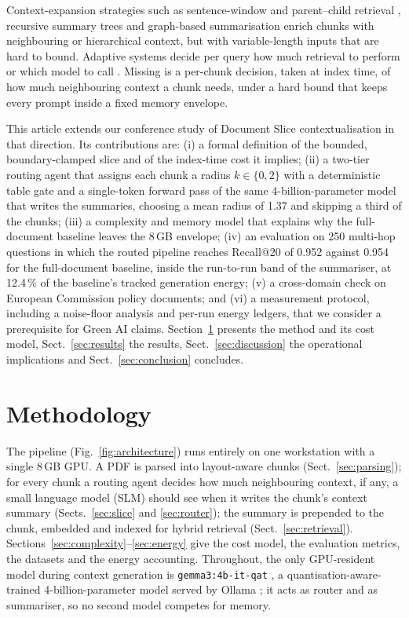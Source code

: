 \documentclass[pdflatex,sn-mathphys-num]{sn-jnl}
\makeatletter
\newcommand{\Rec}[1]{Recall@#1}
\theoremstyle{thmstyleone}%
\theoremstyle{thmstylethree}%
\makeatother
\begin{document}
Context-expansion strategies such as sentence-window and parent--child retrieval \cite{gao2024retrievalaugmentedgenerationlargelanguage,Liu_LlamaIndex_2022}, recursive summary trees \cite{sarthi2024raptorrecursiveabstractiveprocessing} and graph-based summarisation \cite{edge2024graphrag} enrich chunks with neighbouring or hierarchical context, but with variable-length inputs that are hard to bound. Adaptive systems decide per query how much retrieval to perform \cite{jeong2024adaptiverag,asai2024selfrag} or which model to call \cite{ong2024routellm,chen2023frugalgpt}. Missing is a per-chunk decision, taken at index time, of how much neighbouring context a chunk needs, under a hard bound that keeps every prompt inside a fixed memory envelope.

This article extends our conference study of Document Slice contextualisation \cite{sandor2025documentslicecontextualretrieval} in that direction. Its contributions are: (i) a formal definition of the bounded, boundary-clamped slice and of the index-time cost it implies; (ii) a two-tier routing agent that assigns each chunk a radius $k\in\{0,2\}$ with a deterministic table gate and a single-token forward pass of the same 4-billion-parameter model that writes the summaries, choosing a mean radius of 1.37 and skipping a third of the chunks; (iii) a complexity and memory model that explains why the full-document baseline leaves the 8\,GB envelope; (iv) an evaluation on 250 multi-hop questions in which the routed pipeline reaches \Rec{20} of 0.952 against 0.954 for the full-document baseline, inside the run-to-run band of the summariser, at 12.4\,\% of the baseline's tracked generation energy; (v) a cross-domain check on European Commission policy documents; and (vi) a measurement protocol, including a noise-floor analysis and per-run energy ledgers, that we consider a prerequisite for Green AI claims. Section~\ref{sec:method} presents the method and its cost model, Sect.~\ref{sec:results} the results, Sect.~\ref{sec:discussion} the operational implications and Sect.~\ref{sec:conclusion} concludes.

\section{Methodology}\label{sec:method}

The pipeline (Fig.~\ref{fig:architecture}) runs entirely on one workstation with a single 8\,GB GPU. A PDF is parsed into layout-aware chunks (Sect.~\ref{sec:parsing}); for every chunk a routing agent decides how much neighbouring context, if any, a small language model (SLM) should see when it writes the chunk's context summary (Sects.~\ref{sec:slice} and \ref{sec:router}); the summary is prepended to the chunk, embedded and indexed for hybrid retrieval (Sect.~\ref{sec:retrieval}). Sections~\ref{sec:complexity}--\ref{sec:energy} give the cost model, the evaluation metrics, the datasets and the energy accounting. Throughout, the only GPU-resident model during context generation is \texttt{gemma3:4b-it-qat} \cite{gemma3report2025}, a quantisation-aware-trained 4-billion-parameter model served by Ollama \cite{ollama}; it acts as router and as summariser, so no second model competes for memory.
\end{document}

